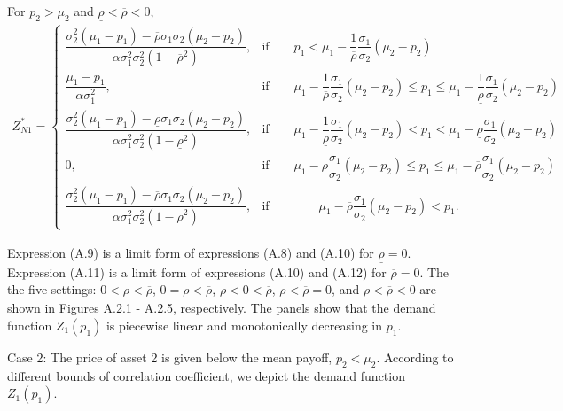 \documentclass[10pt]{article}
\begin{document}
For $ p_2 > \mu_2 $ and $ \underline{\rho} < \overline{\rho} < 0 $,
{\footnotesize \begin{eqnarray}
Z_{N 1}^* = \left\{ \begin{matrix}
\dfrac{\sigma_2^2 (\mu_1 - p_1) - \overline{\rho} \sigma_1 \sigma_2 (\mu_2 - p_2)}{\alpha \sigma_1^2 \sigma_2^2 (1 - \overline{\rho}^2)}, & \text{if} \qquad p_1 < \mu_1 - \dfrac1{\overline{\rho}} \dfrac{\sigma_1}{\sigma_2} (\mu_2 - p_2) \\
\dfrac{\mu_1 - p_1}{\alpha \sigma_1^2}, & \text{if} \qquad \mu_1 - \dfrac1{\overline{\rho}} \dfrac{\sigma_1}{\sigma_2} (\mu_2 - p_2) \leqslant p_1 \leqslant \mu_1 - \dfrac1{\underline{\rho}} \dfrac{\sigma_1}{\sigma_2} (\mu_2 - p_2) \\
\dfrac{\sigma_2^2 (\mu_1 - p_1) - \underline{\rho} \sigma_1 \sigma_2 (\mu_2 - p_2)}{\alpha \sigma_1^2 \sigma_2^2 (1 - \underline{\rho}^2)}, & \text{if} \qquad \mu_1 - \dfrac1{\underline{\rho}} \dfrac{\sigma_1}{\sigma_2} (\mu_2 - p_2) < p_1 < \mu_1 - \underline{\rho} \dfrac{\sigma_1}{\sigma_2} (\mu_2 - p_2) \\
0, & \text{if} \qquad \mu_1 - \underline{\rho} \dfrac{\sigma_1}{\sigma_2} (\mu_2 - p_2) \leqslant p_1 \leqslant \mu_1 - \overline{\rho} \dfrac{\sigma_1}{\sigma_2} (\mu_2 - p_2) \\
\dfrac{\sigma_2^2 (\mu_1 - p_1) - \overline{\rho} \sigma_1 \sigma_2 (\mu_2 - p_2)}{\alpha \sigma_1^2 \sigma_2^2 (1 - \overline{\rho}^2)}, & \text{if} \qquad \qquad \mu_1 - \overline{\rho} \dfrac{\sigma_1}{\sigma_2} (\mu_2 - p_2) < p_1.
\end{matrix} \right.
\end{eqnarray}}

Expression (A.9) is a limit form of expressions (A.8) and (A.10) for $ \underline{\rho} = 0 $.
Expression (A.11) is a limit form of expressions (A.10) and (A.12) for $ \overline{\rho} = 0 $.
The the five settings: $ 0 < \underline{\rho} < \overline{\rho} $, $ 0 = \underline{\rho} < \overline{\rho} $, $ \underline{\rho} < 0 < \overline{\rho} $, $ \underline{\rho} < \overline{\rho} = 0 $, and $ \underline{\rho} < \overline{\rho} < 0 $ are shown in Figures A.2.1 - A.2.5, respectively. The panels show that the demand function $ Z_1 (p_1) $ is piecewise linear and monotonically decreasing in $ p_1 $.

Case 2: The price of asset 2 is given below the mean payoff, $ p_2 < \mu_2 $. According to different bounds of correlation coefficient, we depict the demand function $ Z_1 (p_1) $.
\end{document}
